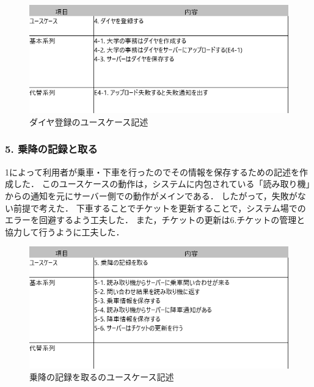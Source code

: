 \documentclass[documentclass]{jsarticle}
\begin{document}
\begin{figure}[H]
  \begin{center}
    \includegraphics*[scale=0.6]{figure/4-4.png}
  \end{center}
  \caption{ダイヤ登録のユースケース記述}
  \label{fig:4-4}
\end{figure}

\subsubsection*{5. 乗降の記録と取る}
1によって利用者が乗車・下車を行ったのでその情報を保存するための記述を作成した．
このユースケースの動作は，システムに内包されている「読み取り機」からの通知を元にサーバー側での動作がメインである．
したがって，失敗がない前提で考えた．
下車することでチケットを更新することで，システム場でのエラーを回避するよう工夫した．
また，チケットの更新は6.チケットの管理と協力して行うように工夫した．

\begin{figure}[H]
  \begin{center}
    \includegraphics*[scale=0.6]{figure/4-5.png}
  \end{center}
  \caption{乗降の記録を取るのユースケース記述}
  \label{fig:5-4}
\end{figure}
\end{document}
